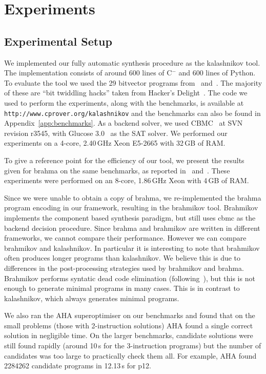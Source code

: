 \documentclass[a4paper]{llncs}
\newcommand{\newC}{C$^-$\xspace}
\begin{document}
\section{Experiments}
\label{sec:experiments}
\subsection{Experimental Setup}
We implemented our fully automatic synthesis procedure as the {\sc kalashnikov} tool.  The implementation consists
of around 600 lines of \newC and 600 lines of Python.  To evaluate the tool we used the 29 bitvector
programs from~\cite{brahma} and~\cite{brahma-icse}.  The majority of these are ``bit twiddling hacks'' taken from
Hacker's Delight~\cite{hackers-delight}.  The code we used to perform the experiments, along with the
benchmarks, is available at \texttt{http://www.cprover.org/kalashnikov} and the benchmarks can also
be found in Appendix~\ref{app:benchmarks}.  As a backend solver, we used
{\sc CBMC}~\cite{cbmc-website} at SVN revision r3545, with Glucose 3.0~\cite{glucose-paper} as the SAT solver.
We performed our experiments on a 4-core, 2.40\,GHz Xeon E5-2665 with 32\,GB of RAM.

To give a reference point for the efficiency of our tool, we present the results given for {\sc brahma}
on the same benchmarks, as reported in~\cite{brahma} and~\cite{brahma-icse}.
These experiments were performed on an 8-core,
1.86\,GHz Xeon with 4\,GB of RAM.

Since we were unable to obtain a copy of {\sc brahma}, we re-implemented the {\sc brahma} program encoding in our framework,
resulting in the {\sc brahmikov} tool. {\sc Brahmikov} implements the component based synthesis
paradigm, but still uses {\sc cbmc} as the backend decision procedure.  Since {\sc brahma} and {\sc brahmikov} are written in
different frameworks, we cannot compare their performance.  However we can compare {\sc brahmikov} and {\sc kalashnikov}.
In particular it is interesting to note that {\sc brahmikov} often produces longer programs than {\sc kalashnikov}.  We
believe this is due to differences in the post-processing strategies used by {\sc brahmikov} and {\sc brahma}.  {\sc Brahmikov}
performs syntatic dead code elimination (following~\cite{brahma}), but this is not enough to generate minimal programs
in many cases.  This is in contrast to {\sc kalashnikov}, which always generates minimal programs.

We also ran the {\sc AHA} superoptimiser on our benchmarks and found that on the small problems
(those with 2-instruction solutions)
{\sc AHA} found a single correct solution in negligible time.  On the larger benchmarks, candidate solutions
were still found rapidly (around 10\,s for the 3-instruction programs) but the number of candidates was
too large to practically check them all.  For example, {\sc AHA} found 2284262 candidate
programs in 12.13\,s for p12.
\end{document}
